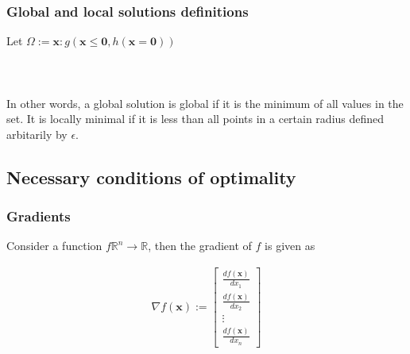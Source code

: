 \subsubsection{Global and local solutions definitions}
Let $\Omega := {\textbf{x} : g(\textbf{x} \leq \textbf{0}, h(\textbf{x} = \textbf{0}))}$
\\ \\ 
\\ \\ 
In other words, a global solution is global if it is the minimum of all values in the set. It is locally minimal if it is less than all points in a certain radius defined arbitarily by $\epsilon$.
\subsection{Necessary conditions of optimality}
\subsubsection{Gradients}
Consider a function $f \mathbb{R}^n \to \mathbb{R}$, then the gradient of $f$ is given as 

\begin{align}
  \nabla f(\textbf{x}) := 
  \begin{bmatrix}
     \frac{d f(\textbf{x})}{d x_1} \\ 
     \frac{d f(\textbf{x})}{d x_2} \\ 
     \vdots \\
     \frac{d f(\textbf{x})}{d x_n}
  \end{bmatrix}
\end{align}

